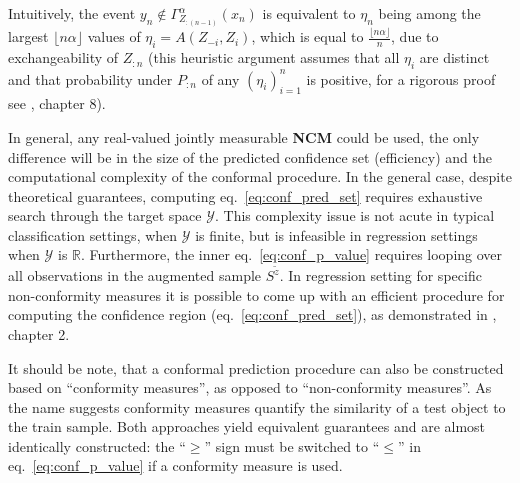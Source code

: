 \documentclass[a4paper,14pt]{extarticle}
\newcommand{\Ycal}{\mathcal{Y}}
\newcommand{\Real}{\mathbb{R}}
\begin{document}
Intuitively, the event $y_n \notin \Gamma^\alpha_{Z_{:(n-1)}}(x_n)$ is equivalent
to $\eta_n$ being among the largest $\lfloor n\alpha\rfloor$ values of $\eta_i = A(Z_{-i}, Z_i)$,
which is equal to $\frac{\lfloor n\alpha\rfloor}{n}$, due to exchangeability of
$Z_{:n}$ (this heuristic argument assumes that all $\eta_i$ are distinct and that
probability under $P_{:n}$ of any $(\eta_i)_{i=1}^n$ is positive, for a rigorous
proof see \cite{vovk2005}, chapter 8).

In general, any real-valued jointly measurable \textbf{NCM} could be used, the only
difference will be in the size of the predicted confidence set (efficiency) and the
computational complexity of the conformal procedure. In the general case, despite
theoretical guarantees, computing eq.~\ref{eq:conf_pred_set} requires exhaustive
search through the target space $\Ycal$. This complexity issue is not acute in typical
classification settings, when $\Ycal$ is finite, but is infeasible in regression
settings when $\Ycal$ is $\Real$. Furthermore, the inner eq.~\ref{eq:conf_p_value}
requires looping over all observations in the augmented sample $S^{\tilde{z}}$.
In regression setting for specific non-conformity measures it is possible to come
up with an efficient procedure for computing the confidence region (eq.~\ref{eq:conf_pred_set}),
as demonstrated in \cite{vovk2005}, chapter 2.

It should be note, that a conformal prediction procedure can also be constructed
based on ``conformity measures'', as opposed to ``non-conformity measures''. As
the name suggests conformity measures quantify the similarity of a test object to
the train sample. Both approaches yield equivalent guarantees and are almost identically
constructed: the ``$\geq$'' sign must be switched to ``$\leq$'' in eq.~\ref{eq:conf_p_value}
if a conformity measure is used.



\end{document}
